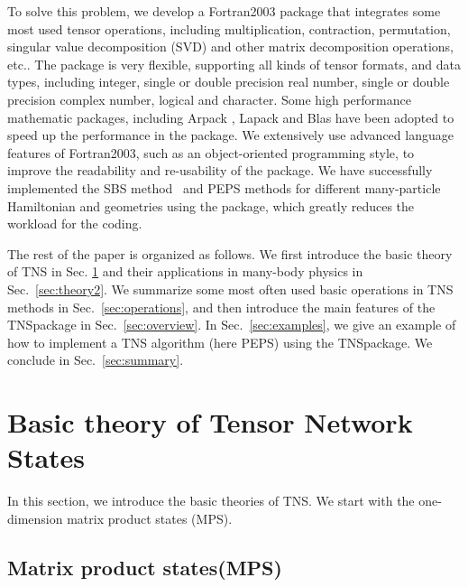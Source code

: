 \documentclass[preprint,3p,times,preprint,showpacs,amsmath,superscriptaddress,floatfix]{elsarticle}
\begin{document}
To solve this problem, we develop a Fortran2003 package that integrates some most used tensor operations,
including multiplication, contraction, permutation, singular value decomposition (SVD) and other matrix decomposition operations, etc..
The package is very flexible, supporting all kinds of tensor formats, and data types, including
integer, single or double precision real number, single or double precision complex number, logical and character.
Some high performance mathematic packages, including Arpack \cite{Arpack}, Lapack \cite{LapackAndBlas} and Blas \cite{LapackAndBlas}
have been adopted to speed up the performance in the package.
We extensively use advanced language features of Fortran2003, such as an object-oriented programming
style, to improve the readability and re-usability of the package.
We have successfully implemented the SBS method~\cite{Dong,WangChao} and PEPS methods \cite{liu16} for different many-particle Hamiltonian and geometries
using the package, which greatly reduces the workload for the coding.


The rest of the paper is organized as follows.
We first introduce the basic theory of TNS in Sec. \ref{sec:theory} and their applications in
many-body physics in Sec.~\ref{sec:theory2}.
We summarize some most often used basic operations in TNS methods in Sec.~\ref{sec:operations},
and then introduce the main features of the TNSpackage in Sec.~\ref{sec:overview}.
In Sec.~\ref{sec:examples}, we give an example of how to implement a TNS algorithm (here PEPS) using the TNSpackage.
We conclude in Sec.~\ref{sec:summary}.

\section{Basic theory of Tensor Network States}
\label{sec:theory}

In this section, we introduce the basic theories of TNS.
We start with the one-dimension matrix product states (MPS)\cite{Vidal2003,Verstraete2008}.

\subsection{Matrix product states(MPS)}
\end{document}
